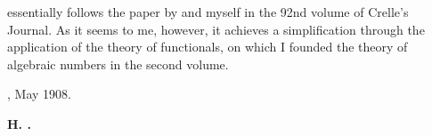 essentially follows the paper by  and myself in the 92nd volume of Crelle's Journal. As it seems to me, however, it achieves a simplification through the application of the theory of functionals, on which I founded the theory of algebraic numbers in the second volume.

\bigskip
{}, May 1908.

\begin{flushright}
\textbf{H. .}
\end{flushright}
